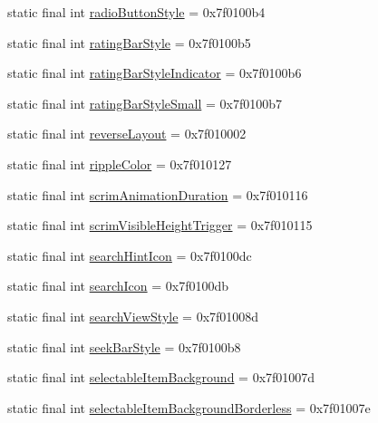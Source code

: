 \begin{CompactItemize}
\item 
static final int \hyperlink{classandroid_1_1support_1_1coreutils_1_1_r_1_1attr_57f616b66aedc31fe360f1557f94f519}{radioButtonStyle} = 0x7f0100b4
\item 
static final int \hyperlink{classandroid_1_1support_1_1coreutils_1_1_r_1_1attr_d2d3d429fd870d9daf633e1f2402963b}{ratingBarStyle} = 0x7f0100b5
\item 
static final int \hyperlink{classandroid_1_1support_1_1coreutils_1_1_r_1_1attr_0e0924ca5a58e76a0a48db31e1b92804}{ratingBarStyleIndicator} = 0x7f0100b6
\item 
static final int \hyperlink{classandroid_1_1support_1_1coreutils_1_1_r_1_1attr_b90348f86a474766bcc5a4ce7cb3684d}{ratingBarStyleSmall} = 0x7f0100b7
\item 
static final int \hyperlink{classandroid_1_1support_1_1coreutils_1_1_r_1_1attr_cd827d62b50ef3a477972e66f5489c83}{reverseLayout} = 0x7f010002
\item 
static final int \hyperlink{classandroid_1_1support_1_1coreutils_1_1_r_1_1attr_d2e6af04578a6944c1b0c6c8dbd256f5}{rippleColor} = 0x7f010127
\item 
static final int \hyperlink{classandroid_1_1support_1_1coreutils_1_1_r_1_1attr_0420faa5eeecf90f33e1971eaa8b0127}{scrimAnimationDuration} = 0x7f010116
\item 
static final int \hyperlink{classandroid_1_1support_1_1coreutils_1_1_r_1_1attr_9ce00b32088bba7791a6f01cddc64bb0}{scrimVisibleHeightTrigger} = 0x7f010115
\item 
static final int \hyperlink{classandroid_1_1support_1_1coreutils_1_1_r_1_1attr_75edf9733f5476d0455dd68bb1e8598e}{searchHintIcon} = 0x7f0100dc
\item 
static final int \hyperlink{classandroid_1_1support_1_1coreutils_1_1_r_1_1attr_3f2c12bf4c5fd1c5e395066e24a99dea}{searchIcon} = 0x7f0100db
\item 
static final int \hyperlink{classandroid_1_1support_1_1coreutils_1_1_r_1_1attr_f92200ea9a39925f5a1c4db383f03f96}{searchViewStyle} = 0x7f01008d
\item 
static final int \hyperlink{classandroid_1_1support_1_1coreutils_1_1_r_1_1attr_439d31b4a050ada639b57016ce4dab58}{seekBarStyle} = 0x7f0100b8
\item 
static final int \hyperlink{classandroid_1_1support_1_1coreutils_1_1_r_1_1attr_09f610d0106e2298656889943e3817a7}{selectableItemBackground} = 0x7f01007d
\item 
static final int \hyperlink{classandroid_1_1support_1_1coreutils_1_1_r_1_1attr_91e94b0b62a24493abf74e86fb2b2312}{selectableItemBackgroundBorderless} = 0x7f01007e

\end{CompactItemize}
